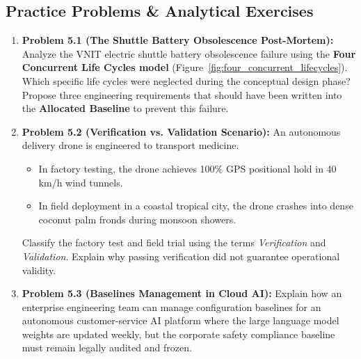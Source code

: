 \subsection{Practice Problems \& Analytical Exercises}

\begin{enumerate}[leftmargin=2em]
    \item \textbf{Problem 5.1 (The Shuttle Battery Obsolescence Post-Mortem):}
    Analyze the VNIT electric shuttle battery obsolescence failure using the \textbf{Four Concurrent Life Cycles model} (Figure~\ref{fig:four_concurrent_lifecycles}). Which specific life cycles were neglected during the conceptual design phase? Propose three engineering requirements that should have been written into the \textbf{Allocated Baseline} to prevent this failure.

    \item \textbf{Problem 5.2 (Verification vs. Validation Scenario):}
    An autonomous delivery drone is engineered to transport medicine. 
    \begin{itemize}
        \item In factory testing, the drone achieves 100\% GPS positional hold in 40 km/h wind tunnels.
        \item In field deployment in a coastal tropical city, the drone crashes into dense coconut palm fronds during monsoon showers.
    \end{itemize}
    Classify the factory test and field trial using the terms \textit{Verification} and \textit{Validation}. Explain why passing verification did not guarantee operational validity.

    \item \textbf{Problem 5.3 (Baselines Management in Cloud AI):}
    Explain how an enterprise engineering team can manage configuration baselines for an autonomous customer-service AI platform where the large language model weights are updated weekly, but the corporate safety compliance baseline must remain legally audited and frozen.
\end{enumerate}

